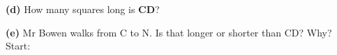 \documentclass[12pt,a4paper]{article}
\newcommand{\qlines}[1]{\par\nobreak
  \noindent\begin{minipage}{\linewidth}\wlines{#1}\end{minipage}\par}
\begin{document}
\vspace{8pt}
\noindent\begin{minipage}{\textwidth}
\noindent\textbf{(d)} How many squares long is \textbf{CD}? \ \blank[2.0cm]

\vspace{8pt}
\noindent\textbf{(e)} Mr Bowen walks from C to N. Is that longer or shorter than CD?
Why? \\[3pt] Start: 
\qlines{2}
\end{minipage}

\end{document}
